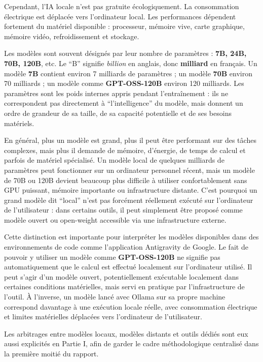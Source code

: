 \documentclass[
  10pt,
  a4paper,
  DIV=11,
  numbers=noendperiod,
  oneside]{scrreprt}
\let\oldtextbf\textbf
\renewcommand{\textbf}[1]{\oldtextbf{\textcolor{cmmnavy}{#1}}}
\let\oldemph\emph
\renewcommand{\emph}[1]{\oldemph{\textcolor{cmmgray}{#1}}}
\begin{document}
Cependant, l'IA locale n'est pas gratuite écologiquement. La
consommation électrique est déplacée vers l'ordinateur local. Les
performances dépendent fortement du matériel disponible : processeur,
mémoire vive, carte graphique, mémoire vidéo, refroidissement et
stockage.

Les modèles sont souvent désignés par leur nombre de paramètres :
\textbf{7B, 24B, 70B, 120B}, etc. Le ``B'' signifie \emph{billion} en
anglais, donc \textbf{milliard} en français. Un modèle \textbf{7B}
contient environ 7 milliards de paramètres ; un modèle \textbf{70B}
environ 70 milliards ; un modèle comme \textbf{GPT-OSS-120B} environ 120
milliards. Les paramètres sont les poids internes appris pendant
l'entraînement : ils ne correspondent pas directement à
``l'intelligence'' du modèle, mais donnent un ordre de grandeur de sa
taille, de sa capacité potentielle et de ses besoins matériels.

En général, plus un modèle est grand, plus il peut être performant sur
des tâches complexes, mais plus il demande de mémoire, d'énergie, de
temps de calcul et parfois de matériel spécialisé. Un modèle local de
quelques milliards de paramètres peut fonctionner sur un ordinateur
personnel récent, mais un modèle de 70B ou 120B devient beaucoup plus
difficile à utiliser confortablement sans GPU puissant, mémoire
importante ou infrastructure distante. C'est pourquoi un grand modèle
dit ``local'' n'est pas forcément réellement exécuté sur l'ordinateur de
l'utilisateur : dans certains outils, il peut simplement être proposé
comme modèle ouvert ou open-weight accessible via une infrastructure
externe.

Cette distinction est importante pour interpréter les modèles
disponibles dans des environnements de code comme l'application
Antigravity de Google. Le fait de pouvoir y utiliser un modèle comme
\textbf{GPT-OSS-120B} ne signifie pas automatiquement que le calcul est
effectué localement sur l'ordinateur utilisé. Il peut s'agir d'un modèle
ouvert, potentiellement exécutable localement dans certaines conditions
matérielles, mais servi en pratique par l'infrastructure de l'outil. À
l'inverse, un modèle lancé avec Ollama sur sa propre machine correspond
davantage à une exécution locale réelle, avec consommation électrique et
limites matérielles déplacées vers l'ordinateur de l'utilisateur.

Les arbitrages entre modèles locaux, modèles distants et outils dédiés
sont eux aussi explicités en Partie I, afin de garder le cadre
méthodologique centralisé dans la première moitié du rapport.
\end{document}
